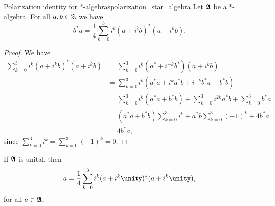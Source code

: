 \begin{proposition}{Polarization identity for *-algebras}{polarization_star_algebra}
    Let \(\mathfrak{A}\) be a *-algebra. For all \(a, b \in \mathfrak{A}\) we have
    \begin{equation*}
        b^*a = \frac14 \sum_{k=0}^3 i^k(a + i^kb)^*(a + i^kb).
    \end{equation*}
\end{proposition}
\begin{proof}
    We have
    \begin{align*}
        \sum_{k=0}^3 i^k(a + i^kb)^*(a + i^kb) &= \sum_{k=0}^3 i^k(a^* + i^{-k}b^*)(a + i^kb)\\
                                               &= \sum_{k=0}^3 i^k(a^*a + i^ka^*b + i^{-k}b^*a + b^*b)\\
                                               &= \sum_{k=0}^3 i^k(a^*a + b^*b) + \sum_{k=0}^3 i^{2k} a^*b + \sum_{k = 0}^3 b^*a\\
                                               &= (a^*a + b^*b)\sum_{k=0}^3 i^k + a^*b\sum_{k=0}^3 (-1)^{k}  + 4b^*a\\
                                               &= 4 b^*a,
    \end{align*}
    since \(\sum_{k=0}^3 i^k = \sum_{k=0}^3 (-1)^k = 0\).
\end{proof}
\begin{remark}
    If \(\mathfrak{A}\) is unital, then
    \begin{equation*}
        a = \frac14 \sum_{k=0}^3 i^k(a + i^k\unity)^*(a + i^k\unity),
    \end{equation*}
    for all \(a \in \mathfrak{A}\).
\end{remark}


